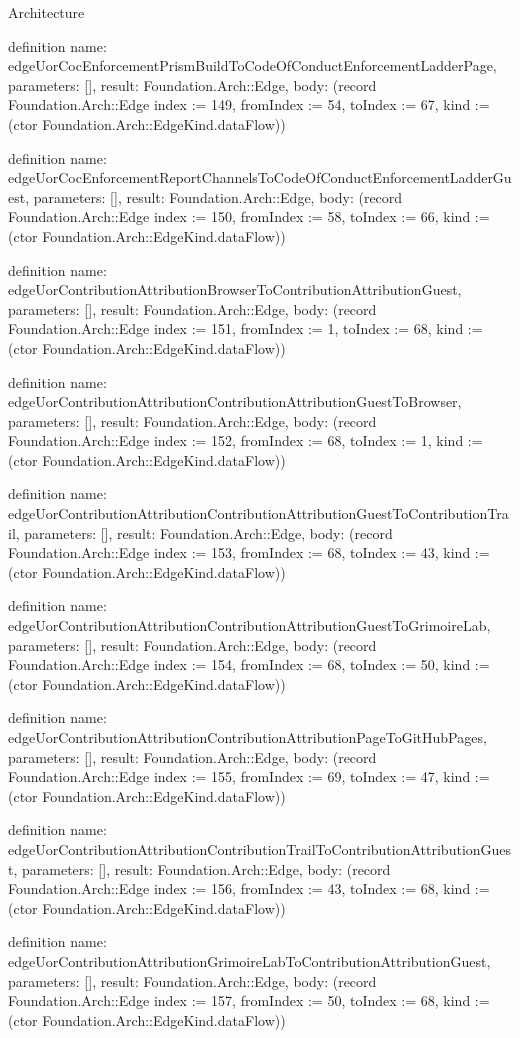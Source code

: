 \begin{lexlean}{Architecture}
\begin{semanticmodule}
definition{
  name: edgeUorCocEnforcementPrismBuildToCodeOfConductEnforcementLadderPage,
  parameters: [],
  result: Foundation.Arch::Edge,
  body: (record Foundation.Arch::Edge {index := 149, fromIndex := 54, toIndex := 67, kind := (ctor Foundation.Arch::EdgeKind.dataFlow)})
}

definition{
  name: edgeUorCocEnforcementReportChannelsToCodeOfConductEnforcementLadderGuest,
  parameters: [],
  result: Foundation.Arch::Edge,
  body: (record Foundation.Arch::Edge {index := 150, fromIndex := 58, toIndex := 66, kind := (ctor Foundation.Arch::EdgeKind.dataFlow)})
}

definition{
  name: edgeUorContributionAttributionBrowserToContributionAttributionGuest,
  parameters: [],
  result: Foundation.Arch::Edge,
  body: (record Foundation.Arch::Edge {index := 151, fromIndex := 1, toIndex := 68, kind := (ctor Foundation.Arch::EdgeKind.dataFlow)})
}

definition{
  name: edgeUorContributionAttributionContributionAttributionGuestToBrowser,
  parameters: [],
  result: Foundation.Arch::Edge,
  body: (record Foundation.Arch::Edge {index := 152, fromIndex := 68, toIndex := 1, kind := (ctor Foundation.Arch::EdgeKind.dataFlow)})
}

definition{
  name: edgeUorContributionAttributionContributionAttributionGuestToContributionTrail,
  parameters: [],
  result: Foundation.Arch::Edge,
  body: (record Foundation.Arch::Edge {index := 153, fromIndex := 68, toIndex := 43, kind := (ctor Foundation.Arch::EdgeKind.dataFlow)})
}

definition{
  name: edgeUorContributionAttributionContributionAttributionGuestToGrimoireLab,
  parameters: [],
  result: Foundation.Arch::Edge,
  body: (record Foundation.Arch::Edge {index := 154, fromIndex := 68, toIndex := 50, kind := (ctor Foundation.Arch::EdgeKind.dataFlow)})
}

definition{
  name: edgeUorContributionAttributionContributionAttributionPageToGitHubPages,
  parameters: [],
  result: Foundation.Arch::Edge,
  body: (record Foundation.Arch::Edge {index := 155, fromIndex := 69, toIndex := 47, kind := (ctor Foundation.Arch::EdgeKind.dataFlow)})
}

definition{
  name: edgeUorContributionAttributionContributionTrailToContributionAttributionGuest,
  parameters: [],
  result: Foundation.Arch::Edge,
  body: (record Foundation.Arch::Edge {index := 156, fromIndex := 43, toIndex := 68, kind := (ctor Foundation.Arch::EdgeKind.dataFlow)})
}

definition{
  name: edgeUorContributionAttributionGrimoireLabToContributionAttributionGuest,
  parameters: [],
  result: Foundation.Arch::Edge,
  body: (record Foundation.Arch::Edge {index := 157, fromIndex := 50, toIndex := 68, kind := (ctor Foundation.Arch::EdgeKind.dataFlow)})
}


\end{semanticmodule}
\end{lexlean}
